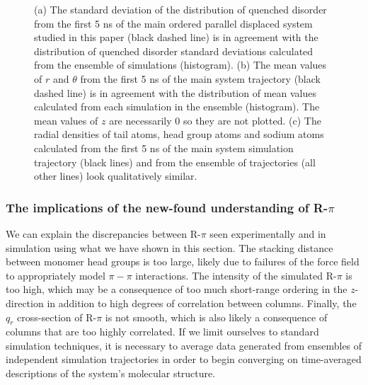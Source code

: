 \documentclass[journal=jpcbfk,manuscript=article]{achemso}
\begin{document}
\begin{figure}[!htb]
\begin{subfigure}{\textwidth}
  \caption{}\label{fig:offset_ensemble_regional_density}
  \end{subfigure}
  \caption{(a) The standard deviation of the distribution of quenched disorder
  from the first 5 ns of the main ordered parallel displaced system studied in
  this paper (black dashed line) is in agreement with the distribution of quenched disorder 
  standard deviations calculated from the ensemble of simulations (histogram). 
  (b) The mean values of $r$ and $\theta$ from the first 5 ns of the main
  system trajectory (black dashed line) is in agreement with the distribution of mean values
  calculated from each simulation in the ensemble (histogram). The mean values of $z$
  are necessarily 0 so they are not plotted. (c) The radial densities of tail
  atoms, head group atoms and sodium atoms calculated from the first 5 ns of the
  main system simulation trajectory (black lines) and from the ensemble of 
  trajectories (all other lines) look qualitatively similar.}\label{fig:ensemble_stds}
  \end{figure}

  \subsubsection*{The implications of the new-found understanding of R-$\pi$}

  We can explain the discrepancies between R-$\pi$ seen experimentally
  and in simulation using what we have shown in this section. The stacking
  distance between monomer head groups is too large, likely due to failures
  of the force field to appropriately model $\pi-\pi$ interactions. The intensity
  of the simulated R-$\pi$ is too high, which may be a consequence of too much short-range
  ordering in the $z$-direction in addition to high degrees of correlation 
  between columns. Finally, the $q_r$ cross-section of R-$\pi$ is not smooth, 
  which is also likely a consequence of columns that are too highly correlated.
  If we limit ourselves to standard simulation techniques, it is necessary to 
  average data generated from ensembles of independent simulation trajectories
  in order to begin converging on time-averaged descriptions of the system's
  molecular structure. 
  
\end{document}
